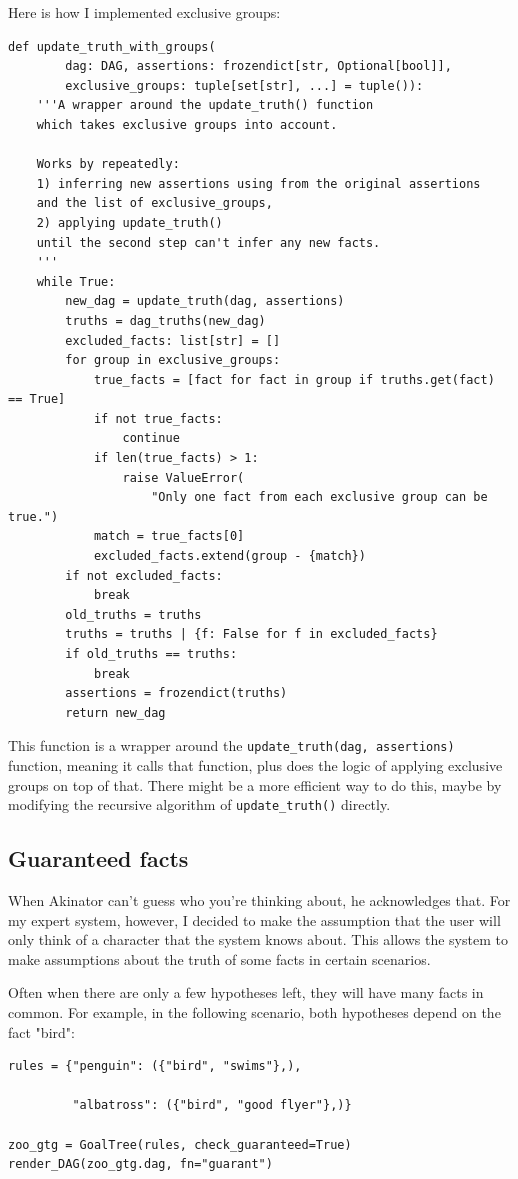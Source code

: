 \documentclass[11pt]{article}
\begin{document}
Here is how I implemented exclusive groups:
\begin{verbatim}
def update_truth_with_groups(
        dag: DAG, assertions: frozendict[str, Optional[bool]],
        exclusive_groups: tuple[set[str], ...] = tuple()):
    '''A wrapper around the update_truth() function
    which takes exclusive groups into account.

    Works by repeatedly:
    1) inferring new assertions using from the original assertions
    and the list of exclusive_groups,
    2) applying update_truth()
    until the second step can't infer any new facts.
    '''
    while True:
        new_dag = update_truth(dag, assertions)
        truths = dag_truths(new_dag)
        excluded_facts: list[str] = []
        for group in exclusive_groups:
            true_facts = [fact for fact in group if truths.get(fact) == True]
            if not true_facts:
                continue
            if len(true_facts) > 1:
                raise ValueError(
                    "Only one fact from each exclusive group can be true.")
            match = true_facts[0]
            excluded_facts.extend(group - {match})
        if not excluded_facts:
            break
        old_truths = truths
        truths = truths | {f: False for f in excluded_facts}
        if old_truths == truths:
            break
        assertions = frozendict(truths)
        return new_dag
\end{verbatim}

This function is a wrapper around the \texttt{update\_truth(dag, assertions)} function,
meaning it calls that function, plus does the logic of applying exclusive groups on top of that.
There might be a more efficient way to do this,
maybe by modifying the recursive algorithm of \texttt{update\_truth()} directly.

\subsection{Guaranteed facts}
\label{sec:orgcac11e0}

When Akinator can't guess who you're thinking about, he acknowledges that.
For my expert system, however, I decided to make the assumption that the user will only think
of a character that the system knows about.
This allows the system to make assumptions about the truth of some facts in certain scenarios.

Often when there are only a few hypotheses left, they will have many facts in common.
For example, in the following scenario, both hypotheses depend on the fact "bird":
\begin{verbatim}
rules = {"penguin": ({"bird", "swims"},),

         "albatross": ({"bird", "good flyer"},)}

zoo_gtg = GoalTree(rules, check_guaranteed=True)
render_DAG(zoo_gtg.dag, fn="guarant")
\end{verbatim}
\end{document}
